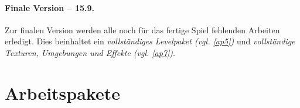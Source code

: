 \paragraph{Finale Version -- 15.9.}
\noindent
Zur finalen Version werden alle noch für das fertige Spiel fehlenden Arbeiten erledigt. Dies beinhaltet ein \textit{vollständiges Levelpaket (vgl. \ref{ap5})} und \textit{vollständige Texturen, Umgebungen und Effekte (vgl. \ref{ap7})}.
\section{Arbeitspakete}

